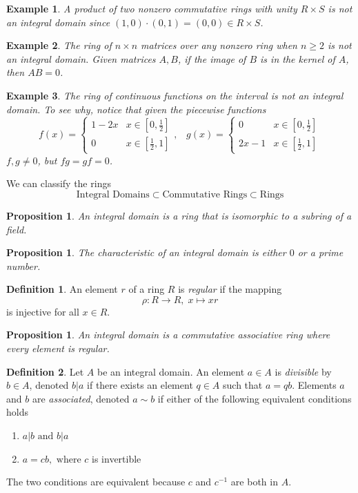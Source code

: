 \documentclass{article}
\newtheorem{proposition}[theorem]{Proposition}
\newtheorem{example}{Example}[section]
\theoremstyle{remark}
\theoremstyle{definition}
\newtheorem{definition}{Definition}[section]
\begin{document}
\begin{example}
A product of two nonzero commutative rings with unity $R \times S$ is not an integral domain since $(1,0) \cdot (0, 1) = (0, 0) \in R \times S$. 
\end{example}

\begin{example}
The ring of $n \times n$ matrices over any nonzero ring when $ n \geq 2$ is not an integral domain. Given matrices $A, B$, if the image of $B$ is in the kernel of $A$, then $A B = 0$.
\end{example}

\begin{example}
The ring of continuous functions on the interval is not an integral domain. To see why, notice that given the piecewise functions 
\[ f (x) = \begin{cases}
1 - 2x & x \in [0, \frac{1}{2}] \\
0 & x \in [\frac{1}{2}, 1] 
\end{cases}, \; \;\;g (x) = \begin{cases}
0 & x \in [0, \frac{1}{2}] \\
2x - 1 & x \in [\frac{1}{2}, 1] 
\end{cases}\]
$f, g \neq 0$, but $f g = g f = 0$. 
\end{example}

We can classify the rings
\[\text{Integral Domains} \subset \text{Commutative Rings} \subset \text{Rings}\]

\begin{proposition}
An integral domain is a ring that is isomorphic to a subring of a field. 
\end{proposition}

\begin{proposition}
The characteristic of an integral domain is either $0$ or a prime number. 
\end{proposition}

\begin{definition}
 An element $r$ of a ring $R$ is \textit{regular} if the mapping 
\[ \rho: R \longrightarrow R, \; x \mapsto x r \]
is injective for all $x \in R$. 
\end{definition}

\begin{proposition}
An integral domain is a commutative associative ring where every element is regular. 
\end{proposition}

\begin{definition}
Let $A$ be an integral domain. An element $a \in A$ is \textit{divisible} by $b \in A$, denoted $b | a$ if there exists an element $q \in A$ such that $a = q b$. Elements $a$ and $b$ are \textit{associated}, denoted $a \sim b$ if either of the following equivalent conditions holds
\begin{enumerate}
    \item $a | b \text{ and } b | a$
    \item $a = c b, \text{ where } c$ is invertible
\end{enumerate}
The two conditions are equivalent because $c$ and $c^{-1}$ are both in $A$. 
\end{definition}
\end{document}
